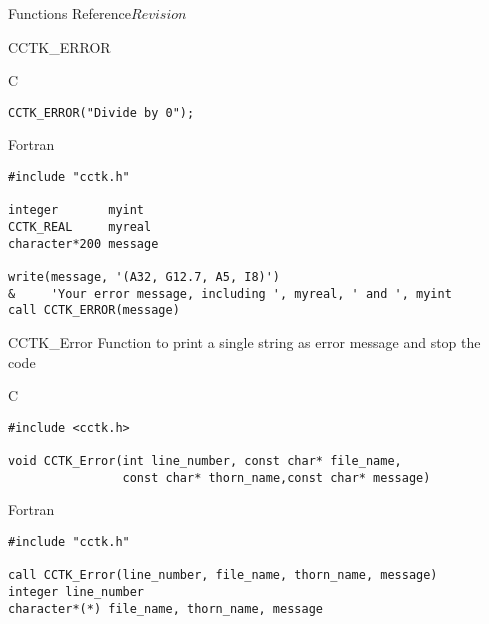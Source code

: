 \begin{cactuspart}{ Functions Reference}{}{$Revision$}
\begin{FunctionDescription}{CCTK\_ERROR}
\begin{ExampleSection}
\begin{Example}{C}
\begin{verbatim}
CCTK_ERROR("Divide by 0");
\end{verbatim}
\end{Example}
\begin{Example}{Fortran}
\begin{verbatim}
#include "cctk.h"

integer       myint
CCTK_REAL     myreal
character*200 message

write(message, '(A32, G12.7, A5, I8)')
&     'Your error message, including ', myreal, ' and ', myint
call CCTK_ERROR(message)
\end{verbatim}
\end{Example}
\end{ExampleSection}
\end{FunctionDescription}

\begin{FunctionDescription}{CCTK\_Error}
\label{CCTK-Error}
Function to print a single string as error message and stop the code

\begin{SynopsisSection}
\begin{Synopsis}{C}
\begin{verbatim}
#include <cctk.h>

void CCTK_Error(int line_number, const char* file_name, 
                const char* thorn_name,const char* message)
\end{verbatim}
\end{Synopsis}
\begin{Synopsis}{Fortran}
\begin{verbatim}
#include "cctk.h"

call CCTK_Error(line_number, file_name, thorn_name, message)
integer line_number
character*(*) file_name, thorn_name, message
\end{verbatim}
\end{Synopsis}
\end{SynopsisSection}


\end{FunctionDescription}
\end{cactuspart}
